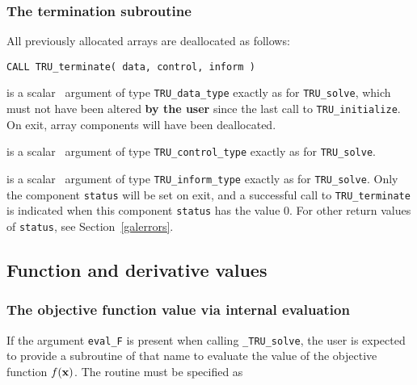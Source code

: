 \documentclass{galahad}
\newcommand{\packagename}{TRU}
\newcommand{\fullpackagename}{\libraryname\_\packagename}
\newcommand{\solver}{{\tt \fullpackagename\_solve}}
\begin{document}

\subsubsection{The  termination subroutine}
All previously allocated arrays are deallocated as follows:
\vspace*{1mm}

\hspace{8mm}
{\tt CALL \packagename\_terminate( data, control, inform )}

\vspace*{-1mm}
\begin{description}

 is a scalar \intentinout\ argument of type
{\tt \packagename\_data\_type}
exactly as for
{\tt \packagename\_solve},
which must not have been altered {\bf by the user} since the last call to
{\tt \packagename\_initialize}.
On exit, array components will have been deallocated.

 is a scalar \intentin\ argument of type
{\tt \packagename\_control\_type}
exactly as for
{\tt \packagename\_solve}.

 is a scalar \intentout\ argument of type
{\tt \packagename\_inform\_type}
exactly as for
{\tt \packagename\_solve}.
Only the component {\tt status} will be set on exit, and a
successful call to
{\tt \packagename\_terminate}
is indicated when this  component {\tt status} has the value 0.
For other return values of {\tt status}, see Section~\ref{galerrors}.

\end{description}


\subsection{Function and derivative values\label{fdv}}


\subsubsection{The objective function value via internal evaluation\label{ffv}}

If the argument {\tt eval\_F} is present when calling \solver, the
user is expected to provide a subroutine of that name to evaluate the
value of the objective function $f({\mathbf{x}})$.
The routine must be specified as
\end{document}
